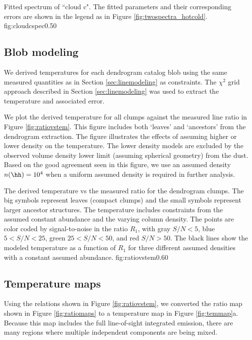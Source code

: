 {Fitted spectrum of ``cloud c".  The fitted parameters and their corresponding
errors are shown in the legend as in Figure \ref{fig:twospectra_hotcold}.}
{fig:cloudcspec}{0.5}{0}



\subsection{Blob modeling}
\label{sec:dendromod}
We derived temperatures for each dendrogram catalog blob using the same
measured quantities as in Section \ref{sec:linemodeling} as constraints.  The
$\chi^2$ grid approach described in Section \ref{sec:linemodeling} was used to
extract the temperature and associated error.

We plot the derived temperature for all clumps against the measured line ratio
in Figure \ref{fig:ratiovstem}.  This figure includes both `leaves' and `ancestors'
from the dendrogram extraction.  The figure illustrates the effects of assuming
higher or lower density on the temperature. The lower density models are
excluded by the observed volume density lower limit (assuming spherical
geometry) from the dust.  Based on
the good agreement seen in this figure, we use an assumed density $n(\hh)=10^4$
\percc when a uniform assumed density is required in further analysis.

{The derived temperature vs the measured ratio \Rone for the dendrogram clumps.
The big symbols represent leaves (compact clumps) and the small symbols
represent larger ancestor structures.
The temperature includes constraints from the assumed constant \formaldehyde
abundance and the 
varying column density.  The points are color coded by signal-to-noise in the
ratio $R_1$, with gray $S/N < 5$, blue $5 < S/N < 25$, green $25 < S/N < 50$,
and red $S/N > 50$.  The black lines show the modeled temperature as a function of
$R_1$ for three different assumed densities with a constant assumed abundance.
}
{fig:ratiovstem}{0.6}{0}

\subsection{Temperature maps}
\label{sec:formaldehydetemmap}
Using the relations shown in Figure \ref{fig:ratiovstem}, we converted the
ratio map shown in Figure \ref{fig:ratiomaps} to a temperature map in Figure
\ref{fig:temmap}a.  Because this map includes the full line-of-sight integrated
emission, there are many regions where multiple independent components are
being mixed.

